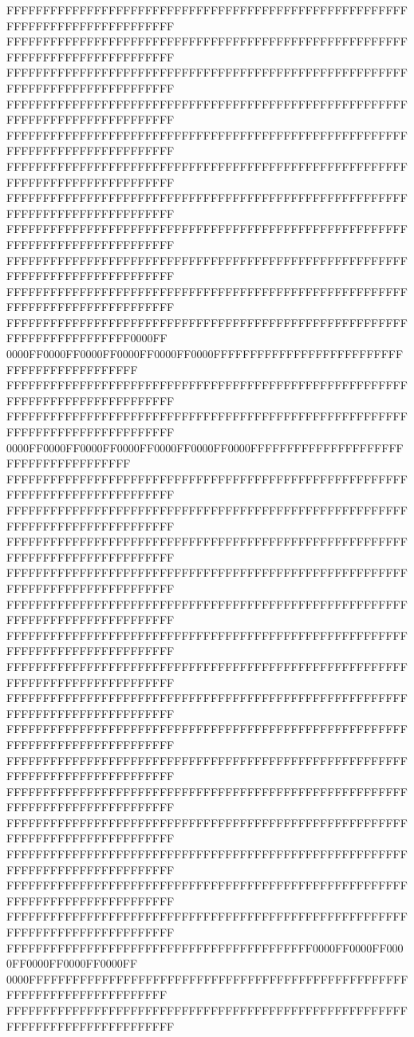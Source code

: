 FFFFFFFFFFFFFFFFFFFFFFFFFFFFFFFFFFFFFFFFFFFFFFFFFFFFFFFFFFFFFFFFFFFFFFFFFFFFFF
FFFFFFFFFFFFFFFFFFFFFFFFFFFFFFFFFFFFFFFFFFFFFFFFFFFFFFFFFFFFFFFFFFFFFFFFFFFFFF
FFFFFFFFFFFFFFFFFFFFFFFFFFFFFFFFFFFFFFFFFFFFFFFFFFFFFFFFFFFFFFFFFFFFFFFFFFFFFF
FFFFFFFFFFFFFFFFFFFFFFFFFFFFFFFFFFFFFFFFFFFFFFFFFFFFFFFFFFFFFFFFFFFFFFFFFFFFFF
FFFFFFFFFFFFFFFFFFFFFFFFFFFFFFFFFFFFFFFFFFFFFFFFFFFFFFFFFFFFFFFFFFFFFFFFFFFFFF
FFFFFFFFFFFFFFFFFFFFFFFFFFFFFFFFFFFFFFFFFFFFFFFFFFFFFFFFFFFFFFFFFFFFFFFFFFFFFF
FFFFFFFFFFFFFFFFFFFFFFFFFFFFFFFFFFFFFFFFFFFFFFFFFFFFFFFFFFFFFFFFFFFFFFFFFFFFFF
FFFFFFFFFFFFFFFFFFFFFFFFFFFFFFFFFFFFFFFFFFFFFFFFFFFFFFFFFFFFFFFFFFFFFFFFFFFFFF
FFFFFFFFFFFFFFFFFFFFFFFFFFFFFFFFFFFFFFFFFFFFFFFFFFFFFFFFFFFFFFFFFFFFFFFFFFFFFF
FFFFFFFFFFFFFFFFFFFFFFFFFFFFFFFFFFFFFFFFFFFFFFFFFFFFFFFFFFFFFFFFFFFFFFFFFFFFFF
FFFFFFFFFFFFFFFFFFFFFFFFFFFFFFFFFFFFFFFFFFFFFFFFFFFFFFFFFFFFFFFFFFFFFFFF0000FF
0000FF0000FF0000FF0000FF0000FF0000FFFFFFFFFFFFFFFFFFFFFFFFFFFFFFFFFFFFFFFFFFFF
FFFFFFFFFFFFFFFFFFFFFFFFFFFFFFFFFFFFFFFFFFFFFFFFFFFFFFFFFFFFFFFFFFFFFFFFFFFFFF
FFFFFFFFFFFFFFFFFFFFFFFFFFFFFFFFFFFFFFFFFFFFFFFFFFFFFFFFFFFFFFFFFFFFFFFFFFFFFF
0000FF0000FF0000FF0000FF0000FF0000FF0000FFFFFFFFFFFFFFFFFFFFFFFFFFFFFFFFFFFFFF
FFFFFFFFFFFFFFFFFFFFFFFFFFFFFFFFFFFFFFFFFFFFFFFFFFFFFFFFFFFFFFFFFFFFFFFFFFFFFF
FFFFFFFFFFFFFFFFFFFFFFFFFFFFFFFFFFFFFFFFFFFFFFFFFFFFFFFFFFFFFFFFFFFFFFFFFFFFFF
FFFFFFFFFFFFFFFFFFFFFFFFFFFFFFFFFFFFFFFFFFFFFFFFFFFFFFFFFFFFFFFFFFFFFFFFFFFFFF
FFFFFFFFFFFFFFFFFFFFFFFFFFFFFFFFFFFFFFFFFFFFFFFFFFFFFFFFFFFFFFFFFFFFFFFFFFFFFF
FFFFFFFFFFFFFFFFFFFFFFFFFFFFFFFFFFFFFFFFFFFFFFFFFFFFFFFFFFFFFFFFFFFFFFFFFFFFFF
FFFFFFFFFFFFFFFFFFFFFFFFFFFFFFFFFFFFFFFFFFFFFFFFFFFFFFFFFFFFFFFFFFFFFFFFFFFFFF
FFFFFFFFFFFFFFFFFFFFFFFFFFFFFFFFFFFFFFFFFFFFFFFFFFFFFFFFFFFFFFFFFFFFFFFFFFFFFF
FFFFFFFFFFFFFFFFFFFFFFFFFFFFFFFFFFFFFFFFFFFFFFFFFFFFFFFFFFFFFFFFFFFFFFFFFFFFFF
FFFFFFFFFFFFFFFFFFFFFFFFFFFFFFFFFFFFFFFFFFFFFFFFFFFFFFFFFFFFFFFFFFFFFFFFFFFFFF
FFFFFFFFFFFFFFFFFFFFFFFFFFFFFFFFFFFFFFFFFFFFFFFFFFFFFFFFFFFFFFFFFFFFFFFFFFFFFF
FFFFFFFFFFFFFFFFFFFFFFFFFFFFFFFFFFFFFFFFFFFFFFFFFFFFFFFFFFFFFFFFFFFFFFFFFFFFFF
FFFFFFFFFFFFFFFFFFFFFFFFFFFFFFFFFFFFFFFFFFFFFFFFFFFFFFFFFFFFFFFFFFFFFFFFFFFFFF
FFFFFFFFFFFFFFFFFFFFFFFFFFFFFFFFFFFFFFFFFFFFFFFFFFFFFFFFFFFFFFFFFFFFFFFFFFFFFF
FFFFFFFFFFFFFFFFFFFFFFFFFFFFFFFFFFFFFFFFFFFFFFFFFFFFFFFFFFFFFFFFFFFFFFFFFFFFFF
FFFFFFFFFFFFFFFFFFFFFFFFFFFFFFFFFFFFFFFFFFFFFFFFFFFFFFFFFFFFFFFFFFFFFFFFFFFFFF
FFFFFFFFFFFFFFFFFFFFFFFFFFFFFFFFFFFFFFFFFF0000FF0000FF0000FF0000FF0000FF0000FF
0000FFFFFFFFFFFFFFFFFFFFFFFFFFFFFFFFFFFFFFFFFFFFFFFFFFFFFFFFFFFFFFFFFFFFFFFFFF
FFFFFFFFFFFFFFFFFFFFFFFFFFFFFFFFFFFFFFFFFFFFFFFFFFFFFFFFFFFFFFFFFFFFFFFFFFFFFF
